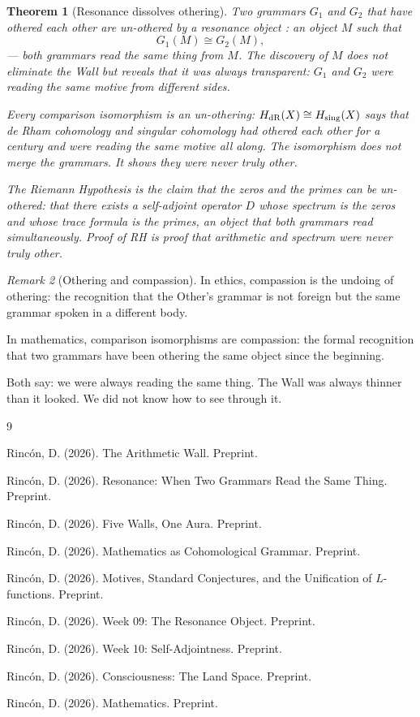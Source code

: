 \documentclass[12pt]{article}
\newtheorem{theorem}{Theorem}
\theoremstyle{definition}
\theoremstyle{remark}
\newtheorem{remark}[theorem]{Remark}
\begin{document}
\begin{theorem}[Resonance dissolves othering]
\label{thm:undo}
Two grammars $G_1$ and $G_2$ that have othered each other
are un-othered by a resonance object \cite{resonance}:
an object $M$ such that
\[
G_1(M) \cong G_2(M),
\]
--- both grammars read the same thing from $M$.
The discovery of $M$ does not eliminate the Wall
but reveals that it was always transparent:
$G_1$ and $G_2$ were reading the same motive \cite{motives}
from different sides.

Every comparison isomorphism is an un-othering:
$H_{\rm dR}(X) \cong H_{\rm sing}(X)$
says that de Rham cohomology and singular cohomology
had othered each other for a century
and were reading the same motive all along.
The isomorphism does not merge the grammars.
It shows they were never truly other.

The Riemann Hypothesis is the claim
that the zeros and the primes can be un-othered:
that there exists a self-adjoint operator $D$ \cite{week10}
whose spectrum is the zeros
and whose trace formula is the primes,
an object that both grammars read simultaneously.
Proof of RH is proof that arithmetic and spectrum
were never truly other.
\end{theorem}

\begin{remark}[Othering and compassion]
In ethics, compassion is the undoing of othering:
the recognition that the Other's grammar
is not foreign but the same grammar
spoken in a different body.

In mathematics, comparison isomorphisms are compassion:
the formal recognition that two grammars
have been othering the same object
since the beginning.

Both say: we were always reading the same thing.
The Wall was always thinner than it looked.
We did not know how to see through it.
\end{remark}

\begin{thebibliography}{9}

Rinc\'on, D. (2026).
The Arithmetic Wall. Preprint.

Rinc\'on, D. (2026).
Resonance: When Two Grammars Read the Same Thing. Preprint.

Rinc\'on, D. (2026).
Five Walls, One Aura. Preprint.

Rinc\'on, D. (2026).
Mathematics as Cohomological Grammar. Preprint.

Rinc\'on, D. (2026).
Motives, Standard Conjectures, and the Unification of $L$-functions.
Preprint.

Rinc\'on, D. (2026).
Week 09: The Resonance Object. Preprint.

Rinc\'on, D. (2026).
Week 10: Self-Adjointness. Preprint.

Rinc\'on, D. (2026).
Consciousness: The Land Space. Preprint.

Rinc\'on, D. (2026).
Mathematics. Preprint.

\end{thebibliography}
\end{document}

